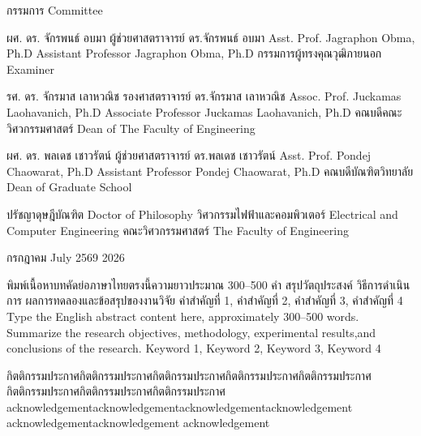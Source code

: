 \committeeName
{กรรมการ}
{Committee}

\examiner
{ผศ. ดร. จักรพนธ์ อบมา}
{ผู้ช่วยศาสตราจารย์ ดร.จักรพนธ์ อบมา}
{Asst. Prof. Jagraphon Obma, Ph.D}
{Assistant Professor Jagraphon Obma, Ph.D}
{กรรมการผู้ทรงคุณวุฒิภายนอก}
{Examiner}

\deanEng
{รศ. ดร. จักรมาส เลาหวณิช}
{รองศาสตราจารย์ ดร.จักรมาส เลาหวณิช}
{Assoc. Prof. Juckamas Laohavanich, Ph.D}
{Associate Professor Juckamas Laohavanich, Ph.D}
{คณบดีคณะวิศวกรรมศาสตร์}
{Dean of The Faculty of Engineering}

\deanGrad
{ผศ. ดร. พลเดช เชาวรัตน์}
{ผู้ช่วยศาสตราจารย์ ดร.พลเดช เชาวรัตน์}
{Asst. Prof. Pondej Chaowarat, Ph.D}
{Assistant Professor Pondej Chaowarat, Ph.D}
{คณบดีบัณฑิตวิทยาลัย}
{Dean of Graduate School}

\degree
{ปรัชญาดุษฎีบัณฑิต}
{Doctor of Philosophy}
{วิศวกรรมไฟฟ้าและคอมพิวเตอร์}
{Electrical and Computer Engineering}
{คณะวิศวกรรมศาสตร์}
{The Faculty of Engineering}

\academicyear
{กรกฎาคม}
{July}
{2569}
{2026}

\abstract
{พิมพ์เนื้อหาบทคัดย่อภาษาไทยตรงนี้ความยาวประมาณ 300--500 คำ สรุปวัตถุประสงค์ วิธีการดำเนินการ ผลการทดลองและข้อสรุปของงานวิจัย}
{คำสำคัญที่ 1, คำสำคัญที่ 2, คำสำคัญที่ 3, คำสำคัญที่ 4}
{Type the English abstract content here, approximately 300--500 words. Summarize the research objectives, methodology, experimental results,and conclusions of the research.}
{Keyword 1, Keyword 2, Keyword 3, Keyword 4}

\acknowledgement
{กิตติกรรมประกาศกิตติกรรมประกาศกิตติกรรมประกาศกิตติกรรมประกาศกิตติกรรมประกาศกิตติกรรมประกาศกิตติกรรมประกาศกิตติกรรมประกาศ}
%
{acknowledgementacknowledgementacknowledgementacknowledgement acknowledgementacknowledgement acknowledgement}

